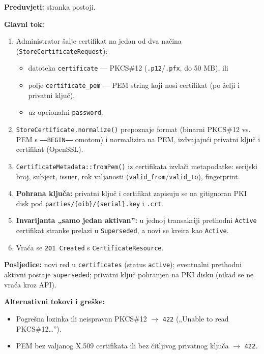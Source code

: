 \documentclass[11pt,a4paper]{article}
\begin{document}
\textbf{Preduvjeti:} stranka postoji.

\textbf{Glavni tok:}
\begin{enumerate}[nosep]
  \item Administrator šalje certifikat na jedan od dva načina (\texttt{StoreCertificateRequest}):
    \begin{itemize}[nosep]
      \item datoteka \texttt{certificate} — PKCS\#12 (\texttt{.p12}/\texttt{.pfx}, do 50 MB), ili
      \item polje \texttt{certificate\_pem} — PEM string koji nosi certifikat (po želji i privatni ključ),
      \item uz opcionalni \texttt{password}.
    \end{itemize}
  \item \texttt{StoreCertificate.normalize()} prepoznaje format (binarni PKCS\#12 vs. PEM s \texttt{-----BEGIN-----}
        omotom) i normalizira na PEM, izdvajajući privatni ključ i certifikat (OpenSSL).
  \item \texttt{CertificateMetadata::fromPem()} iz certifikata izvlači metapodatke: serijski broj,
        subject, issuer, rok valjanosti (\texttt{valid\_from}/\texttt{valid\_to}), fingerprint.
  \item \textbf{Pohrana ključa:} privatni ključ i certifikat zapisuju se na gitignoran PKI disk
        pod \texttt{parties/\{oib\}/\{serial\}.key} i \texttt{.crt}.
  \item \textbf{Invarijanta „samo jedan aktivan”:} u jednoj transakciji prethodni \texttt{Active} certifikat
        stranke prelazi u \texttt{Superseded}, a novi se kreira kao \texttt{Active}.
  \item Vraća se \texttt{201 Created} s \texttt{CertificateResource}.
\end{enumerate}

\textbf{Posljedice:} novi red u \texttt{certificates} (status \texttt{active}); eventualni prethodni aktivni
postaje \texttt{superseded}; privatni ključ pohranjen na PKI disku (nikad se ne vraća kroz API).

\textbf{Alternativni tokovi i greške:}
\begin{itemize}[nosep]
  \item Pogrešna lozinka ili neispravan PKCS\#12 $\rightarrow$ \texttt{422} („Unable to read PKCS\#12\dots”).
  \item PEM bez valjanog X.509 certifikata ili bez čitljivog privatnog ključa $\rightarrow$ \texttt{422}.
\end{itemize}
\end{document}
